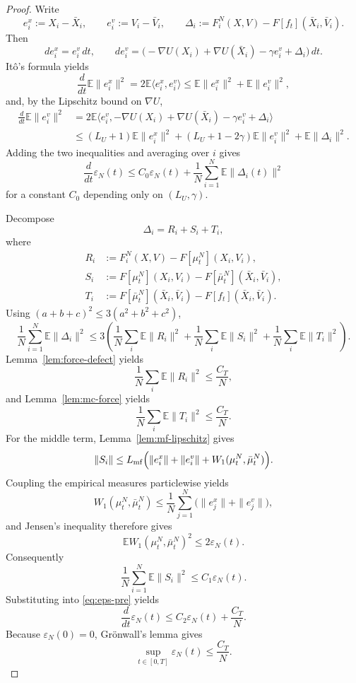 \documentclass[11pt]{article}
\theoremstyle{definition}
\theoremstyle{remark}
\newcommand{\E}{\mathbb{E}}
\begin{document}
\begin{proof}
Write
\[
e_i^x:=X_i-\bar X_i,
\qquad
e_i^v:=V_i-\bar V_i,
\qquad
\Delta_i:=F_i^N(X,V)-F[f_t](\bar X_i,\bar V_i).
\]
Then
\[
de_i^x=e_i^v\,dt,
\qquad
de_i^v=
\bigl(-\nabla U(X_i)+\nabla U(\bar X_i)-\gamma e_i^v+\Delta_i\bigr)\,dt.
\]
It\^o's formula yields
\[
\frac{d}{dt}\E\|e_i^x\|^2
=
2\E\langle e_i^x,e_i^v\rangle
\leq
\E\|e_i^x\|^2+\E\|e_i^v\|^2,
\]
and, by the Lipschitz bound on $\nabla U$,
\begin{align*}
\frac{d}{dt}\E\|e_i^v\|^2
&=
2\E\langle e_i^v,-\nabla U(X_i)+\nabla U(\bar X_i)-\gamma e_i^v+\Delta_i\rangle\\
&\leq
(L_U+1)\E\|e_i^x\|^2
+(L_U+1-2\gamma)\E\|e_i^v\|^2
+\E\|\Delta_i\|^2.
\end{align*}
Adding the two inequalities and averaging over $i$ gives
\begin{equation}\label{eq:eps-pre}
\frac{d}{dt}\varepsilon_N(t)
\leq
C_0\varepsilon_N(t)
+\frac1N\sum_{i=1}^N \E\|\Delta_i(t)\|^2
\end{equation}
for a constant $C_0$ depending only on $(L_U,\gamma)$.

Decompose
\[
\Delta_i=R_i+S_i+T_i,
\]
where
\begin{align*}
R_i&:=F_i^N(X,V)-F[\mu_t^N](X_i,V_i),\\
S_i&:=F[\mu_t^N](X_i,V_i)-F[\bar\mu_t^N](\bar X_i,\bar V_i),\\
T_i&:=F[\bar\mu_t^N](\bar X_i,\bar V_i)-F[f_t](\bar X_i,\bar V_i).
\end{align*}
Using $(a+b+c)^2\leq 3(a^2+b^2+c^2)$,
\[
\frac1N\sum_{i=1}^N \E\|\Delta_i\|^2
\leq
3\left(
\frac1N\sum_i \E\|R_i\|^2
+\frac1N\sum_i \E\|S_i\|^2
+\frac1N\sum_i \E\|T_i\|^2
\right).
\]
Lemma~\ref{lem:force-defect} yields
\[
\frac1N\sum_i \E\|R_i\|^2\leq \frac{C_T}{N},
\]
and Lemma~\ref{lem:mc-force} yields
\[
\frac1N\sum_i \E\|T_i\|^2\leq \frac{C_T}{N}.
\]
For the middle term, Lemma~\ref{lem:mf-lipschitz} gives
\[
\|S_i\|
\leq
L_{\mathrm{mf}}
\Bigl(\|e_i^x\|+\|e_i^v\|+W_1(\mu_t^N,\bar\mu_t^N)\Bigr).
\]
Coupling the empirical measures particlewise yields
\[
W_1(\mu_t^N,\bar\mu_t^N)
\leq
\frac1N\sum_{j=1}^N \bigl(\|e_j^x\|+\|e_j^v\|\bigr),
\]
and Jensen's inequality therefore gives
\[
\E W_1(\mu_t^N,\bar\mu_t^N)^2\leq 2\varepsilon_N(t).
\]
Consequently
\[
\frac1N\sum_{i=1}^N \E\|S_i\|^2
\leq
C_1\varepsilon_N(t).
\]
Substituting into \eqref{eq:eps-pre} yields
\[
\frac{d}{dt}\varepsilon_N(t)
\leq
C_2\varepsilon_N(t)+\frac{C_T}{N}.
\]
Because $\varepsilon_N(0)=0$, Gr\"onwall's lemma gives
\[
\sup_{t\in[0,T]}\varepsilon_N(t)\leq \frac{C_T}{N}.
\]
\end{proof}
\end{document}
